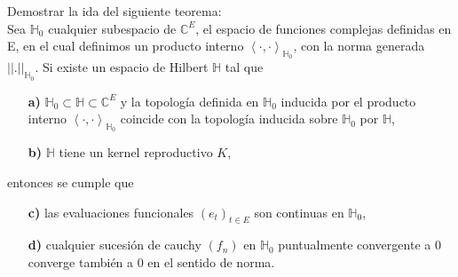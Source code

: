 \documentclass[12pt]{exam}
\begin{document}
\begin{questions}
\question[3] Demostrar la ida del siguiente teorema: \\
\textnormal{Sea $\mathbb{H}_{0}$ cualquier subespacio de $\mathbb{C}^{E}$, el espacio de funciones complejas definidas en E, en el cual definimos un producto interno $\left\langle\cdot,\cdot\right\rangle_{\mathbb{H}_{0}}$, con la norma generada $||.||_{\mathbb{H}_{0}}$. Si existe un espacio de Hilbert $\mathbb{H}$ tal que}
\begin{itemize}
\item[\textnormal{\textbf{a)}}]\textnormal{$\mathbb{H}_{0}\subset\mathbb{H}\subset\mathbb{C}^E$ y la topolog\'ia definida en $\mathbb{H}_{0}$ inducida por el producto interno $\left\langle\cdot,\cdot\right\rangle_{\mathbb{H}_{0}}$ coincide con la topolog\'ia inducida sobre $\mathbb{H}_{0}$ por $\mathbb{H}$,}
\item[\textnormal{\textbf{b)}}]\textnormal{$\mathbb{H}$ tiene un kernel reproductivo $K$,}
\end{itemize}
\textnormal{entonces se cumple que}
\begin{itemize}
\item[\textnormal{\textbf{c)}}]\textnormal{las evaluaciones funcionales $(e_{t})_{t\in E}$ son continuas en $\mathbb{H}_{0}$,}
\item[\textnormal{\textbf{d)}}]\textnormal{cualquier sucesi\'on de cauchy $(f_{n})$ en $\mathbb{H}_{0}$ puntualmente convergente a $0$ converge tambi\'en a $0$ en el sentido de norma.}
\end{itemize}


\addpoints


\end{questions}
\end{document}
